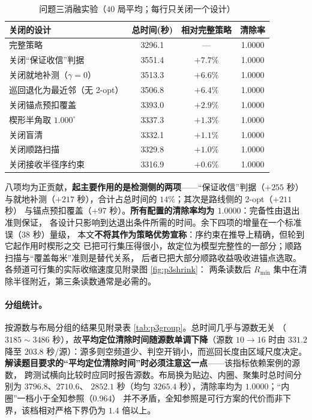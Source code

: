 \documentclass[withoutpreface, bwprint]{cumcmthesis}
\begin{document}
\begin{table}[H]
  \centering
  \caption{问题三消融实验（$40$ 局平均；每行只关闭一个设计）}
  \label{tab:p3ablation}
  \footnotesize
  \begin{tabular}{lccc}
    \toprule
    关闭的设计 & 总时间(秒) & 相对完整策略 & 清除率 \\
    \midrule
    完整策略 & 3296.1 & --- & 1.0000 \\
    关闭“保证收信”判据 & 3551.4 & $+7.7\%$ & 1.0000 \\
    关闭就地补测（$\gamma=0$） & 3513.3 & $+6.6\%$ & 1.0000 \\
    巡回退化为最近邻（无 2-opt） & 3506.8 & $+6.4\%$ & 1.0000 \\
    关闭锚点预扣覆盖 & 3393.0 & $+2.9\%$ & 1.0000 \\
    楔形半角取 $1.000^\circ$ & 3337.3 & $+1.3\%$ & 1.0000 \\
    关闭盲清 & 3332.1 & $+1.1\%$ & 1.0000 \\
    关闭顺路扫描 & 3329.8 & $+1.0\%$ & 1.0000 \\
    关闭接收半径序约束 & 3316.9 & $+0.6\%$ & 1.0000 \\
    \bottomrule
  \end{tabular}
\end{table}

八项均为正贡献，\textbf{起主要作用的是检测侧的两项}——“保证收信”判据（$+255$ 秒）
与就地补测（$+217$ 秒），合计占总时间的 $14\%$；其次是路线侧的 2-opt（$+211$ 秒）
与锚点预扣覆盖（$+97$ 秒）。\textbf{所有配置的清除率均为 $1.0000$}：完备性由退出准则保证，
各设计只影响到达退出条件所需的时间。余下四项的增量在一个标准误（$38$ 秒）量级，
本文\textbf{不将其作为策略优势宣称}：序约束在推导上精确，但轮到它起作用时楔形之交
已把可行集压得很小，故定位为模型完整性的一部分；顺路扫描与“覆盖每米”准则是替代关系，
后者已把大部分顺路收益吸收进锚点选取。各频道可行集的实际收缩速度见附录图 \ref{fig:p3shrink}：
两条读数后 $R_{\min}$ 集中在清除半径附近，第三条读数通常是必需的。

\paragraph{分组统计。}
按源数与布局分组的结果见附录表 \ref{tab:p3group}。总时间几乎与源数无关
（$3185\sim3486$ 秒），故\textbf{平均定位清除时间随源数单调下降}（源数 $10\to16$ 时由
$331.2$ 降至 $203.8$ 秒/源）：源多则空频道少、判空开销小，而巡回长度由区域尺度决定。
\textbf{解读题目要求的“平均定位清除时间”时必须注意这一点}——该指标依赖案例的源数，
跨测试横向比较时应同时报告源数。布局换为贴边、内圈、聚集时总时间分别为 $3796.8$、$2710.6$、
$2852.1$ 秒（均匀 $3265.4$ 秒），清除率均为 $1.0000$；“内圈”一档小于全知参照（$0.964$）
并不矛盾，全知参照是可行方案的代价而非下界，该档相对严格下界仍为 $1.4$ 倍以上。
\end{document}
